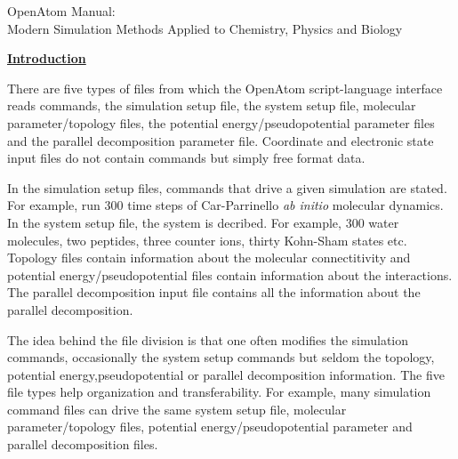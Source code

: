

\textwidth       6.9in
\headheight      0.0in
\headsep         0.0in
\topmargin      -0.3in
\textheight      9.5in
\oddsidemargin  -0.25in
\evensidemargin -0.25in
\footskip        0.25in
\parskip         6pt
\parindent       6pt
\baselineskip   12pt


\large


\vspace*{3.in}
\begin{center}
\huge
OpenAtom Manual: \\
$\ $ \\
\Large
Modern Simulation Methods Applied to Chemistry, Physics and Biology
\end{center}

\clearpage
\huge
\underline{\bf Introduction}
\large

There are five types of files from which the OpenAtom
script-language interface reads commands, the
simulation setup file, the system setup file, molecular parameter/topology
files, the potential energy/pseudopotential parameter files and the
parallel decomposition parameter file. Coordinate and electronic state input files do 
not contain commands but simply free format data. 

In the simulation setup files, commands that drive a given simulation
are stated. For example, run 300 time steps of Car-Parrinello {\em ab initio}
molecular dynamics. In the system setup file, the 
system is decribed. For example, 300 water molecules, two peptides,
three counter ions, thirty Kohn-Sham states etc.  Topology files
contain information about the molecular connectitivity and potential
energy/pseudopotential files contain information about the
interactions. The parallel decomposition
input file contains all the information about the parallel decomposition.

The idea behind the file division is that one often modifies the
simulation commands, occasionally the system setup commands but seldom the 
topology, potential energy,pseudopotential or parallel decomposition
information. 
The five file types help organization and transferability. For
example, many simulation command files can drive the same system setup file, 
molecular parameter/topology files, potential energy/pseudopotential
parameter and parallel decomposition files.

